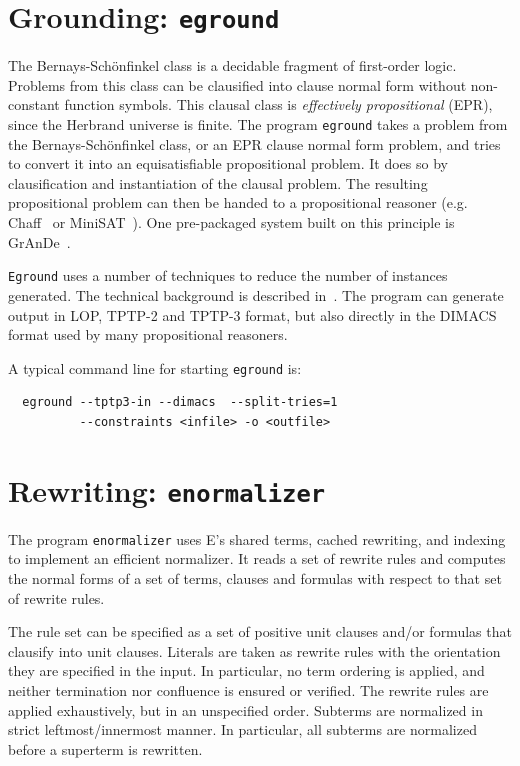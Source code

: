 \documentclass{report}
\begin{document}
\section{Grounding: \texttt{eground}}

The Bernays-Sch{\"o}nfinkel class is a decidable fragment of
first-order logic. Problems from this class can be clausified into
clause normal form without non-constant function symbols. This clausal
class is \emph{effectively propositional} (EPR), since the Herbrand
universe is finite. The program \texttt{eground} takes a problem from
the Bernays-Sch{\"o}nfinkel class, or an EPR clause normal form
problem, and tries to convert it into an equisatisfiable propositional
problem. It does so by clausification and instantiation of the
clausal problem. The resulting propositional problem can then be
handed to a propositional reasoner (e.g. Chaff~\cite{MMZZM:DAC-2001}
or MiniSAT~\cite{ES:SAT-2003}). One pre-packaged system built on this
principle is GrAnDe~\cite{SS:CADE-2002}.

\texttt{Eground} uses a number of techniques to reduce the number of
instances generated. The technical background is described
in~\cite{Schulz:FLAIRS-2002}. The program can generate output in LOP,
TPTP-2 and TPTP-3 format, but also directly in the DIMACS format used
by many propositional reasoners.

A typical command line for starting \texttt{eground} is:

\begin{verbatim}
  eground --tptp3-in --dimacs  --split-tries=1
          --constraints <infile> -o <outfile>
\end{verbatim}


\section{Rewriting: \texttt{enormalizer}}

The program \texttt{enormalizer} uses E's shared terms, cached
rewriting, and indexing to implement an efficient normalizer. It reads
a set of rewrite rules and computes the normal forms of a set of
terms, clauses and formulas with respect to that set of rewrite rules.

The rule set can be specified as a set of positive unit clauses and/or
formulas that clausify into unit clauses. Literals are taken as
rewrite rules with the orientation they are specified in the input. In
particular, no term ordering is applied, and neither termination nor
confluence is ensured or verified. The rewrite rules are applied
exhaustively, but in an unspecified order. Subterms are normalized in
strict leftmost/innermost manner. In particular, all subterms are
normalized before a superterm is rewritten.
\end{document}
